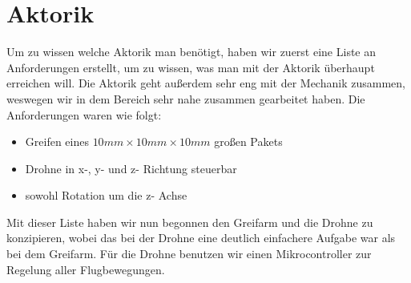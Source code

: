 \section{Aktorik}
Um zu wissen welche Aktorik man benötigt, haben wir zuerst eine Liste an Anforderungen erstellt, um zu wissen, was man mit der Aktorik überhaupt erreichen will. Die Aktorik geht außerdem sehr eng mit der Mechanik zusammen, weswegen wir in dem Bereich sehr nahe zusammen gearbeitet haben. Die Anforderungen waren wie folgt:
\begin{itemize}
	\item Greifen eines $10mm  \times 10mm \times 10mm$ großen Pakets
	\item Drohne in x-, y- und z- Richtung steuerbar
	\item sowohl Rotation um die z- Achse
\end{itemize}
Mit dieser Liste haben wir nun begonnen den Greifarm und die Drohne zu konzipieren, wobei das bei der Drohne eine deutlich einfachere Aufgabe war als bei dem Greifarm. Für die Drohne benutzen wir einen Mikrocontroller zur Regelung aller Flugbewegungen.
